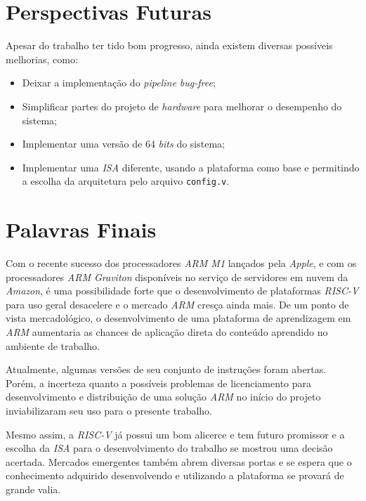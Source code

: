 \section{Perspectivas Futuras}
    { Apesar do trabalho ter tido bom progresso, ainda existem diversas possíveis
        melhorias, como:
    }
    \begin{itemize}
        \item Deixar a implementação do \textit{pipeline bug-free};
        \item Simplificar partes do projeto de \textit{hardware} para melhorar o desempenho do sistema;
        \item Implementar uma versão de 64 \textit{bits} do sistema;
        \item Implementar uma \textit{ISA} diferente, usando a plataforma como base e permitindo a escolha da arquitetura pelo arquivo \texttt{config.v}.
    \end{itemize}


\section{Palavras Finais}

    { Com o recente sucesso dos processadores \textit{ARM M1} lançados pela
        \textit{Apple}, e com os processadores \textit{ARM Graviton} disponíveis
        no serviço de servidores em nuvem da \textit{Amazon}, é uma possibilidade
        forte que o desenvolvimento de plataformas \textit{RISC-V} para uso geral
        desacelere e o mercado \textit{ARM} cresça ainda mais. De um ponto de vista
        mercadológico, o desenvolvimento de uma plataforma de aprendizagem em
        \textit{ARM} aumentaria as chances de aplicação direta do conteúdo aprendido
        no ambiente de trabalho.
    }

    { Atualmente, algumas versões de seu conjunto de instruções foram abertas.
        Porém, a incerteza quanto a possíveis problemas de licenciamento para
        desenvolvimento e distribuição de uma solução \textit{ARM} no início do
        projeto inviabilizaram seu uso para o presente trabalho.
    }

    { Mesmo assim, a \textit{RISC-V} já possui um bom alicerce e tem futuro promissor
        e a escolha da \textit{ISA} para o desenvolvimento do trabalho se mostrou
        uma decisão acertada. Mercados emergentes também abrem diversas portas e
        se espera que o conhecimento adquirido desenvolvendo e utilizando a
        plataforma se provará de grande valia.
    }

